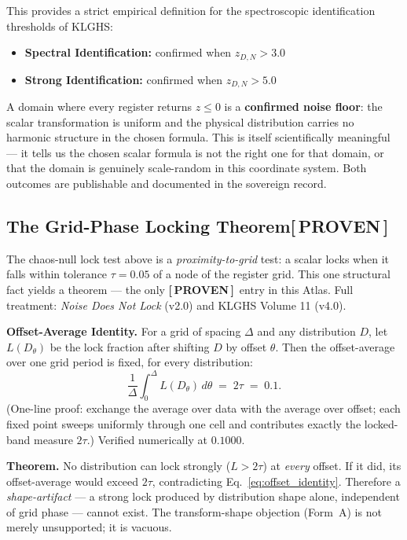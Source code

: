 \documentclass[12pt,oneside]{book}
\newcommand{\ProvenTag}{\;\colorbox{proventag!15}{\textcolor{proventag}{\footnotesize\bfseries [\,PROVEN\,]}}}
\begin{document}
This provides a strict empirical definition for the spectroscopic identification
thresholds of KLGHS:

\begin{itemize}
\item \textbf{Spectral Identification:} confirmed when $z_{D,N} > 3.0$
\item \textbf{Strong Identification:} confirmed when $z_{D,N} > 5.0$
\end{itemize}

A domain where every register returns $z \leq 0$ is a \textbf{confirmed noise floor}:
the scalar transformation is uniform and the physical distribution carries no harmonic
structure in the chosen formula. This is itself scientifically meaningful — it tells us
the chosen scalar formula is not the right one for that domain, or that the domain is
genuinely scale-random in this coordinate system. Both outcomes are publishable and
documented in the sovereign record.

\subsection{The Grid-Phase Locking Theorem\ProvenTag}

The chaos-null lock test above is a \emph{proximity-to-grid} test: a scalar locks when
it falls within tolerance $\tau=0.05$ of a node of the register grid. This one structural
fact yields a theorem --- the only \ProvenTag\ entry in this Atlas. Full treatment:
\emph{Noise Does Not Lock} (v2.0) and KLGHS Volume 11 (v4.0).

\vspace{0.4em}
\noindent\textbf{Offset-Average Identity.} For a grid of spacing $\Delta$ and any
distribution $D$, let $L(D_\theta)$ be the lock fraction after shifting $D$ by offset
$\theta$. Then the offset-average over one grid period is fixed, for every distribution:
\begin{equation}
\frac{1}{\Delta}\int_{0}^{\Delta} L(D_\theta)\,d\theta \;=\; 2\tau \;=\; 0.1 .
\label{eq:offset_identity}
\end{equation}
(One-line proof: exchange the average over data with the average over offset; each fixed
point sweeps uniformly through one cell and contributes exactly the locked-band measure
$2\tau$.) Verified numerically at $0.1000$.

\vspace{0.4em}
\noindent\textbf{Theorem.} No distribution can lock strongly ($L>2\tau$) at \emph{every}
offset. If it did, its offset-average would exceed $2\tau$, contradicting
Eq.~\eqref{eq:offset_identity}. Therefore a \emph{shape-artifact} --- a strong lock
produced by distribution shape alone, independent of grid phase --- cannot exist. The
transform-shape objection (Form~A) is not merely unsupported; it is vacuous.
\end{document}
